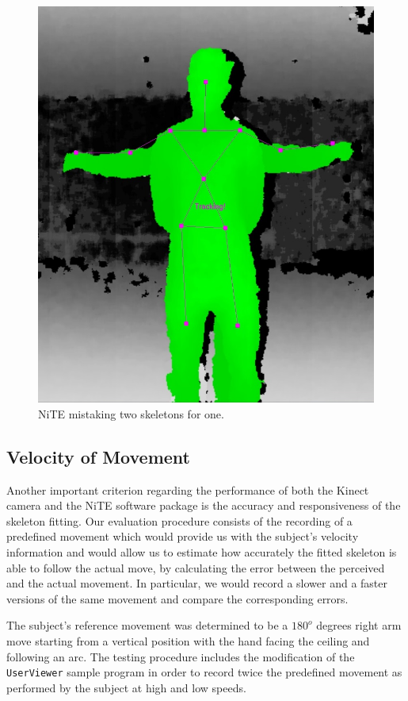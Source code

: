 \documentclass[10pt]{article}
\begin{document}
\begin{figure}[H]
\center
\includegraphics[scale=0.2]{Occlusion2.jpg} 
\caption{NiTE mistaking two skeletons for one.}
\label{occlusion3}
\end{figure} 

\subsection{Velocity of Movement}
Another important criterion regarding the performance of both the Kinect camera and the NiTE software package is the accuracy and responsiveness of the skeleton fitting. Our evaluation procedure consists of the recording of a predefined movement which would provide us with the subject's velocity information and would allow us to estimate how accurately the fitted skeleton is able to follow the actual move, by calculating the error between the perceived and the actual movement. In particular, we would record a slower and a faster versions of the same movement and compare the corresponding errors.

The subject's reference movement was determined to be a $180^o$ degrees right arm move starting from a vertical position with the hand facing the ceiling and following an arc. The testing procedure includes the modification of the \texttt{UserViewer} sample program in order to record twice the predefined movement as performed by the subject at high and low speeds. 
\end{document}
